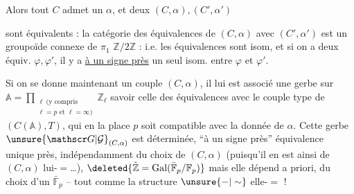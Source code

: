 
Alors tout $C$ admet un $\alpha$, et deux $(C,\alpha),(C',\alpha')$



sont équivalents : la catégorie des équivalences
de $(C,\alpha)$ avec $(C',\alpha')$ est un groupoïde connexe de
$\pi_1$ $\mathbb Z/2\mathbb Z$ : i.e.  les équivalences sont
isom, et si on a deux équiv. $\varphi,\varphi'$, il y a \uline{à un
signe près} un seul isom. entre $\varphi$ et $\varphi'$.

Si on se donne maintenant un couple $(C,\alpha)$,
il lui est associé une  gerbe sur $\mathbb A=\prod_{\substack{\ell\ (\text{y compris}\\\ell=p\text{ et }\ell=\infty)}}\mathbb Z_\ell$
 savoir celle des équivalences  avec le  couple
type de $(C(\mathbb A),T)$, qui en la place $p$ soit
compatible avec la donnée de $\alpha$. Cette gerbe
$\unsure{\mathscr G|\mathcal G}_{(C,\alpha)}$ est déterminée, ``à un signe près''  équivalence
unique près, indépendamment du choix de $(C,\alpha)$
(puisqu'il en est ainsi de $(C,\alpha)$ lui-$=$\ldots), 
$\deleted{\hat{\mathbb Z}=\mathrm{Gal}(\bar{\mathbb F}_p/\mathbb F_p)}$  mais elle dépend
a priori,  du choix d'un $\bar{\mathbb F}_p$  -- tout comme la structure $\unsure{-|\sim}$ elle-$=$ !



